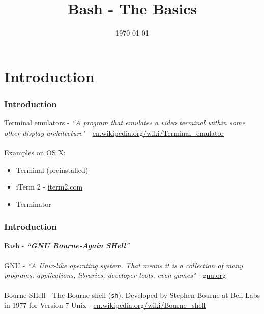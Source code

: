 \documentclass{beamer}
\title[Bash]{Bash - The Basics} %
\author{} %
\institute[] %
{
 \\ %
\medskip
\textit{chris@cjwfuller.com}
}
\date{\today}
\begin{document}
\begin{frame}
\titlepage
\end{frame}

\section{Introduction}

\begin{frame}
\frametitle{Introduction}
Terminal emulators  - \textit{``A program that emulates a video terminal within some other display architecture"} - \url{en.wikipedia.org/wiki/Terminal_emulator}
\\~\\
Examples on OS X:
\begin{itemize}
	\item Terminal (preinstalled)
	\item iTerm 2 - \url{iterm2.com}
	\item Terminator
\end{itemize}
\end{frame}


\begin{frame}
\frametitle{Introduction}
Bash - \textbf{\textit{``GNU Bourne-Again SHell"}}
\\~\\
GNU - \textit{``A Unix-like operating system. That means it is a collection of many programs: applications, libraries, developer tools, even games"} - \url{gnu.org}
\\~\\
Bourne SHell - The Bourne shell (\texttt{sh}).  Developed by Stephen Bourne at Bell Labs in 1977 for Version 7 Unix - \url{en.wikipedia.org/wiki/Bourne_shell}
\end{frame}


\begin{frame}[fragile]
\frametitle{}
	\scriptsize
	\begin{verbatim}
	\end{verbatim}
\end{frame}
\end{document}
